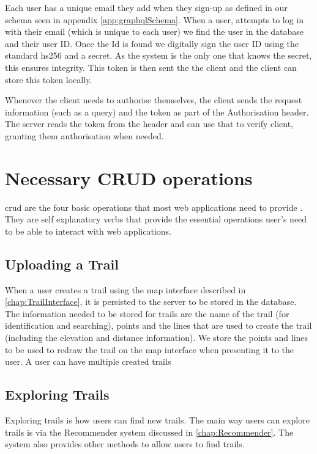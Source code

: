Each user has a unique email they add when they sign-up as defined in our schema seen in appendix \ref{app:graphqlSchema}. When a user, attempts to log in with their email (which is unique to each user) we find the user in the database and their user ID. Once the Id is found we digitally sign the user ID using the standard \acrfull{hs256} and a secret. As the system is the only one that knows the secret, this ensures integrity. This token is then sent the the client and the client can store this token locally.

Whenever the client needs to authorise themselves, the client sends the request information (such as a query) and the token as part of the Authorisation header. The server reads the token from the header and can use that to verify client, granting them authorisation when needed.

\section{Necessary CRUD operations} \label{sec:ExtraFeatures}
\acrfull{crud} are the four basic operations that most web applications need to provide \cite{codeacademy2019crud}. They are self explanatory verbs that provide the essential operations user's need to be able to interact with web applications.

\subsection{Uploading a Trail}
When a user creates a trail using the map interface described in \autoref{chap:TrailInterface}, it is persisted to the server to be stored in the database. The information needed to be stored for trails are the name of the trail (for identification and searching), points and the lines that are used to create the trail (including the elevation and distance information). We store the points and lines to be used to redraw the trail on the map interface when presenting it to the user. A user can have multiple created trails

\subsection{Exploring Trails}
Exploring trails is how users can find new trails. The main way users can explore trails is via the Recommender system discussed in \autoref{chap:Recommender}. The system also provides other methods to allow users to find trails.

